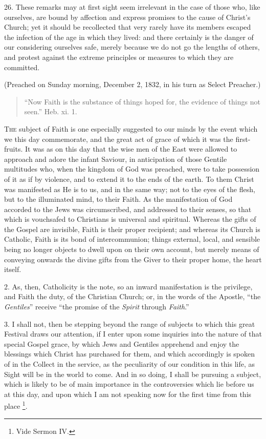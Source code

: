 26. These remarks may at first sight seem irrelevant in the case of
those who, like ourselves, are bound by affection and express promises
to the cause of Christ's Church; yet it should be recollected that
very rarely have its members escaped the infection of the age in which
they lived: and there certainly is the danger of our considering
ourselves safe, merely because we do not go the lengths of others, and
protest against the extreme principles or measures to which they are
committed.

(Preached on Sunday morning, December 2, 1832, in his turn as
Select Preacher.)


\begin{quote}

``Now Faith is the substance of things hoped for, the
evidence of things not seen.'' Heb. xi. 1.

\end{quote}

T\textsc{he} subject of Faith is one especially suggested to our minds by
the event which we this day commemorate, and the great act of grace of
which it was the first-fruits. It was as on this day that the wise men
of the East were allowed to approach and adore the infant Saviour, in
anticipation of those Gentile multitudes who, when the kingdom of God
was preached, were to take possession of it as if by violence, and to
extend it to the ends of the earth. To them Christ was manifested as
He is to us, and in the same way; not to the eyes of the flesh, but to
the illuminated mind, to their Faith. As the manifestation of God
accorded to the Jews was circumscribed, and addressed to their senses,
so that which is vouchsafed to Christians is universal and spiritual.
Whereas the gifts of the Gospel are invisible, Faith is their proper
recipient; and whereas its Church is Catholic, Faith is its bond of
intercommunion; things external, local, and sensible being no longer
objects to dwell upon on their own account, but merely means of
conveying onwards the divine gifts from the Giver to their proper
home, the heart itself.

2. As, then, Catholicity is the note, so an inward manifestation is
the privilege, and Faith the duty, of the Christian Church; or, in the
words of the Apostle, ``the \emph{Gentiles}'' receive
``the promise of the \emph{Spirit} through \emph{Faith}.''

3. I shall not, then be stepping beyond the range of subjects to
which this great Festival draws our attention, if I enter upon some
inquiries into the nature of that special Gospel grace, by which Jews
and Gentiles apprehend and enjoy the blessings which Christ has
purchased for them, and which accordingly is spoken of in the Collect
in the service, as the peculiarity of our condition in this life, as
Sight will be in the world to come. And in so doing, I shall be
pursuing a subject, which is likely to be of main importance in the
controversies which lie before us at this day, and upon which I am not
speaking now for the first time from this place \footnote{Vide Sermon IV.}.

